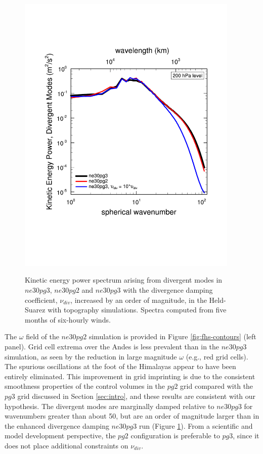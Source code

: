 \documentclass{agujournal}
\begin{document}
\begin{figure}[t]
\begin{center}
\noindent\includegraphics[width=25pc,angle=0]{figs/fhstopo_Divergence_ne30pg2-v-ne30pg3-v-10Xnudiv.pdf}\\
\end{center}
\caption{Kinetic energy power spectrum arising from divergent modes in $ne30pg3$, $ne30pg2$ and $ne30pg3$ with the divergence damping coefficient, $\nu_{div}$, increased by an order of magnitude, in the Held-Suarez with topography simulations. Spectra computed from five months of six-hourly winds.}
\label{fig:fhs-div}
\end{figure}

The $\omega$ field of the $ne30pg2$ simulation is provided in Figure \ref{fig:fhs-contours} (left panel). Grid cell extrema over the Andes is less prevalent than in the $ne30pg3$ simulation, as seen by the reduction in large magnitude $\omega$ (e.g., red grid cells). The spurious oscillations at the foot of the Himalayas appear to have been entirely eliminated. This improvement in grid imprinting is due to the consistent smoothness properties of the control volumes in the $pg2$ grid compared with the $pg3$ grid discussed in Section \ref{sec:intro}, and these results are consistent with our hypothesis. The divergent modes are marginally damped relative to $ne30pg3$ for wavenumbers greater than about 50, but are an order of magnitude larger than in the enhanced divergence damping $ne30pg3$ run (Figure \ref{fig:fhs-div}). From a scientific and model development perspective, the $pg2$ configuration is preferable to $pg3$, since it does not place additional constraints on $\nu_{div}$.
\end{document}
